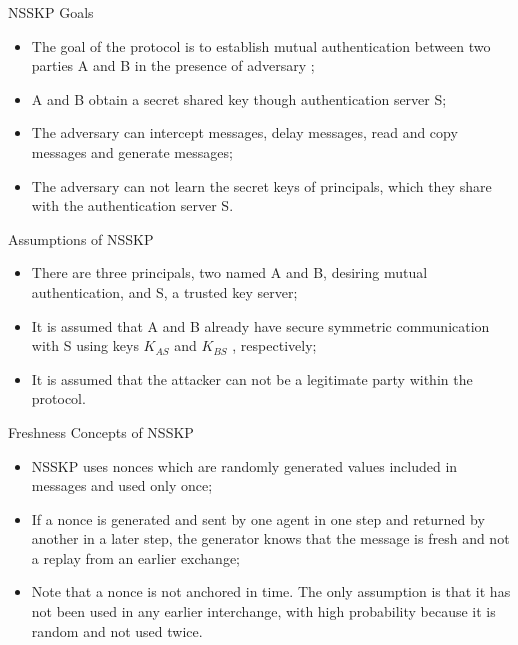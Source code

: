 \documentclass[12pt,table,xcolor={dvipsnames}]{beamer}
\begin{document}
\begin{frame}{NSSKP Goals}
\begin{itemize}
\item The goal of the protocol is to establish mutual authentication between two parties A and B in the presence of adversary		;\pause
\item  A and B obtain a secret shared key though authentication server S;\pause
\item The adversary can intercept messages, delay messages, read and copy messages and generate messages;\pause
\item The adversary can not learn the secret keys of principals, which they share with the authentication server S.
\end{itemize}
\end{frame}

\begin{frame}{Assumptions of NSSKP}
\begin{itemize}
\item There are three principals, two named A and B, desiring mutual authentication, and
S, a trusted key server;\pause
\item It is assumed that A and B already have secure symmetric communication with
S using keys $K_{AS}$ and $K_{BS}$ , respectively;\pause
\item It is assumed that the attacker can not be a legitimate party within the protocol.
\end{itemize}
\end{frame}

\begin{frame}{Freshness Concepts of NSSKP}
\begin{itemize}
\item NSSKP uses nonces which are randomly generated values included in messages and used only once;\pause
\item If a nonce is generated and sent by one agent in one step and returned by another in a later step, the generator knows that the message is fresh and not a replay from an earlier exchange;\pause
\item Note that a nonce is not anchored in time. The only assumption is that it has not been used in any earlier interchange, with high probability because it is random and not used twice.
\end{itemize}
\end{frame}
\end{document}
